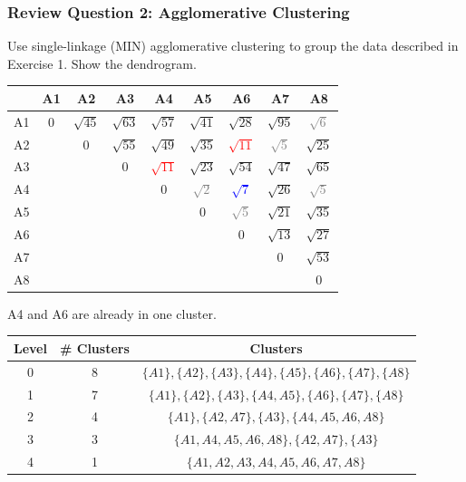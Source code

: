 \documentclass[aspectratio=169, 10pt]{beamer}
\begin{document}
\begin{frame}[t]
    \frametitle{Review Question 2: Agglomerative Clustering}
    \small
    Use single-linkage (MIN) agglomerative clustering to group the data described in Exercise 1. Show the dendrogram.
    \begin{table}[]
        \scriptsize
        \begin{tabular}{c|cccccccc}
           & A1 & A2 & A3 & A4 & A5 & A6 & A7 & A8 \\ \hline
        A1 & $0$  & $\sqrt{45}$ & $\sqrt{63}$ & $\sqrt{57}$ & $\sqrt{41}$ & $\sqrt{28}$ & $\sqrt{95}$ & \textcolor{gray}{$\sqrt{6}$} \\
        A2 &    & $0$  & $\sqrt{55}$ & $\sqrt{49}$ & $\sqrt{35}$ & \textcolor{red}{$\sqrt{11}$} & \textcolor{gray}{$\sqrt{5}$}  & $\sqrt{25}$ \\
        A3 &    &    & $0$  & \textcolor{red}{$\sqrt{11}$} & $\sqrt{23}$ & $\sqrt{54}$ & $\sqrt{47}$ & $\sqrt{65}$ \\ 
        A4 &    &    &    & $0$  & \textcolor{gray}{$\sqrt{2}$} & \textcolor{blue}{$\sqrt{7}$}  & $\sqrt{26}$ & \textcolor{gray}{$\sqrt{5}$}  \\
        A5 &    &    &    &    & $0$  & \textcolor{gray}{$\sqrt{5}$}  & $\sqrt{21}$ & $\sqrt{35}$ \\
        A6 &    &    &    &    &    & $0$  & $\sqrt{13}$ & $\sqrt{27}$ \\
        A7 &    &    &    &    &    &    & $0$  & $\sqrt{53}$ \\
        A8 &    &    &    &    &    &    &    & $0$ \\
        \end{tabular}
    \end{table}

    A4 and A6 are already in one cluster.

    \begin{table}[]
        \scriptsize
        \begin{tabular}{c|c|c}
        Level & \# Clusters & Clusters \\ \hline
        0     & 8           & $\{A1\}, \{A2\}, \{A3\}, \{A4\}, \{A5\}, \{A6\}, \{A7\}, \{A8\}$\\
        1     & 7           & $\{A1\}, \{A2\}, \{A3\}, \{A4, A5\}, \{A6\}, \{A7\}, \{A8\}$\\
        2     & 4           & $\{A1\}, \{A2, A7\}, \{A3\}, \{A4, A5, A6,A8\}$\\
        3     & 3           & $\{A1, A4, A5, A6,A8\}, \{A2, A7\}, \{A3\}$\\
        4     & 1           & $\{A1, A2, A3, A4, A5, A6, A7, A8\}$
        \end{tabular}
    \end{table}

\end{frame}
\end{document}
